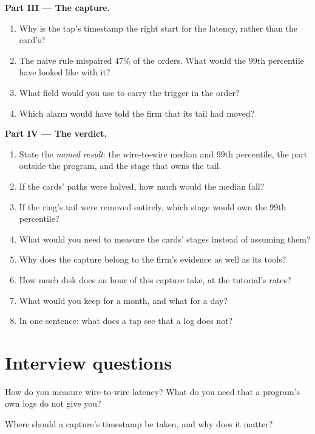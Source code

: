 \begin{problem}
\medskip\noindent\textbf{Part III --- The capture.}
\begin{enumerate}[resume]
\item Why is the tap's timestamp the right start for the latency, rather than the card's?
\item The naive rule mispaired 47\% of the orders. What would the 99th percentile have looked like with it?
\item What field would you use to carry the trigger in the order?
\item Which alarm would have told the firm that its tail had moved?
\end{enumerate}

\medskip\noindent\textbf{Part IV --- The verdict.}
\begin{enumerate}[resume]
\item State the \emph{named result}: the wire-to-wire median and 99th percentile, the part outside the program, and the stage that owns the
  tail.
\item If the cards' paths were halved, how much would the median fall?
\item If the ring's tail were removed entirely, which stage would own the 99th percentile?
\item What would you need to measure the cards' stages instead of assuming them?
\item Why does the capture belong to the firm's evidence as well as its tools?
\item How much disk does an hour of this capture take, at the tutorial's rates?
\item What would you keep for a month, and what for a day?
\item In one sentence: what does a tap see that a log does not?
\end{enumerate}
\end{problem}

\section{Interview questions}

\begin{interviewq}\label{iq:nw:capturing-and-monitoring-the-network:1}
How do you measure wire-to-wire latency? What do you need that a program's own logs do not give you?
\end{interviewq}

\begin{interviewq}\label{iq:nw:capturing-and-monitoring-the-network:2}
Where should a capture's timestamp be taken, and why does it matter?
\end{interviewq}

